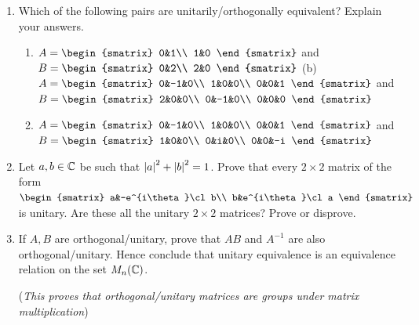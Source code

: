 \begin{exercises}
\begin{enumerate}
	  
	  \item Which of the following pairs are unitarily/orthogonally equivalent? Explain your answers.
	  \begin{enumerate}
	    \item $A=
	    \begin{smatrix}
	    	0&1\\
	    	1&0
	    \end{smatrix}$
	    and $B=
	    \begin{smatrix}
	    	0&2\\
	    	2&0
	    \end{smatrix}$
	    \qquad\quad (b)\ \ $A=
	    \begin{smatrix}
	    	0&-1&0\\
	    	1&0&0\\
	    	0&0&1
	    \end{smatrix}$
	    and $B=
	    \begin{smatrix}
	    	2&0&0\\
	    	0&-1&0\\
	    	0&0&0
	    \end{smatrix}$
	    \item[(c)] $A=
	    \begin{smatrix}
	    	0&-1&0\\
	    	1&0&0\\
	    	0&0&1
	    \end{smatrix}$ 
	    and $B=
	    \begin{smatrix}
	    	1&0&0\\
	    	0&i&0\\
	    	0&0&-i
	    \end{smatrix}$
	  \end{enumerate}
		
		
		\item Let $a,b\in\mathbb{C}$ be such that $\left| a\right|^2+\left| b\right|^2=1$. Prove that every $2\times 2$ matrix of the form 
		$\begin{smatrix}
			a&-e^{i\theta}\cl b\\
			b&e^{i\theta}\cl a
		\end{smatrix}$ 
		is unitary. Are these all the unitary $2\times 2$ matrices? Prove or disprove.
		
		
		\item\label{exs:unitaryequiv} If $A,B$ are orthogonal/unitary, prove that $AB$ and $A^{-1}$ are also orthogonal/unitary. Hence conclude that unitary equivalence is an equivalence relation on the set $M_n(\mathbb{C})$.\par
		(\emph{This proves that orthogonal/unitary matrices are groups under matrix multiplication})
	  

\end{enumerate}
\end{exercises}
